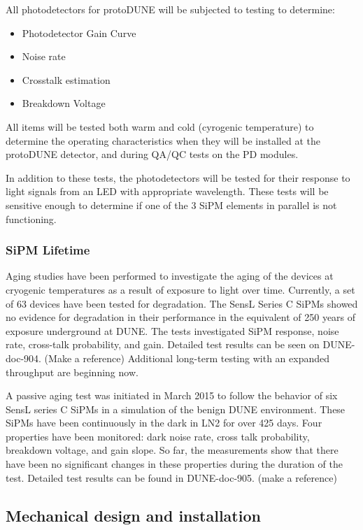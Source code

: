 All photodetectors for protoDUNE will be subjected to testing to determine:
\begin{itemize}
\item Photodetector Gain Curve
\item Noise rate
\item Crosstalk estimation
\item Breakdown Voltage
\end{itemize}
All items will be tested both warm and cold (cyrogenic temperature) to 
determine the operating characteristics when they will be installed at
the protoDUNE detector, and during QA/QC tests on the PD modules.

In addition to these tests, the photodetectors will be tested for their
response to light signals from an LED with appropriate wavelength.
These tests will be sensitive enough to determine if one of the 3 SiPM
elements in parallel is not functioning.

\subsubsection{SiPM Lifetime}
Aging studies have been performed to investigate the aging of the devices at 
cryogenic temperatures as a result of exposure to light over time.
Currently, a set of 63 devices have been tested for degradation.
The SensL Series C SiPMs showed no evidence for degradation in their 
performance in the equivalent of 250 years of exposure underground at DUNE. 
The tests investigated SiPM response, noise rate, cross-talk probability, and
gain.
Detailed test results can be seen on DUNE-doc-904. (Make a reference) 
Additional long-term testing with an expanded throughput are beginning
now.

A passive aging test was initiated in March 2015 to follow the
behavior of six SensL series C SiPMs in a simulation of the benign
DUNE environment. These SiPMs have been continuously in the
dark in LN2 for over 425 days. Four properties have been monitored:
dark noise rate, cross talk probability, breakdown voltage, and gain
slope. So far, the measurements show that there
have been no significant changes in these properties during the
duration of the test.
Detailed test results can be found in DUNE-doc-905. (make a reference)

\subsection{Mechanical design and installation}

